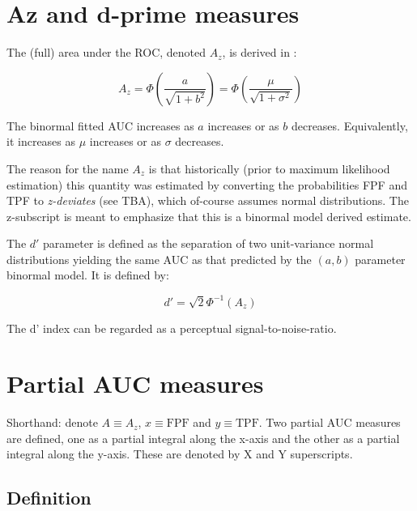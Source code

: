 \documentclass[
]{book}
\begin{document}
\hypertarget{binormal-model-full-auc}{%
\section{Az and d-prime measures}\label{binormal-model-full-auc}}

The (full) area under the ROC, denoted \(A_z\), is derived in \citep{thompson1989statistical}:

\begin{equation} 
A_z=\Phi\left ( \frac{a}{\sqrt{1+b^2}} \right )=\Phi\left ( \frac{\mu}{\sqrt{1+\sigma^2}} \right )
\label{eq:binormal-model-ab-2az}
\end{equation}

The binormal fitted AUC increases as \(a\) increases or as \(b\) decreases. Equivalently, it increases as \(\mu\) increases or as \(\sigma\) decreases.

The reason for the name \(A_z\) is that historically (prior to maximum likelihood estimation) this quantity was estimated by converting the probabilities FPF and TPF to \emph{z-deviates} (see TBA), which of-course assumes normal distributions. The z-subscript is meant to emphasize that this is a binormal model derived estimate.

The \(d'\) parameter is defined as the separation of two unit-variance normal distributions yielding the same AUC as that predicted by the \((a,b)\) parameter binormal model. It is defined by:

\begin{equation} 
d'=\sqrt{2}\Phi^{-1}\left ( A_z \right )
\label{eq:binormal-model-ab-2dprime}
\end{equation}

The d' index can be regarded as a perceptual signal-to-noise-ratio.

\hypertarget{binormal-model-partial-auc}{%
\section{Partial AUC measures}\label{binormal-model-partial-auc}}

Shorthand: denote \(A \equiv A_z\), \(x \equiv \text{FPF}\) and \(y \equiv \text{TPF}\). Two partial AUC measures are defined, one as a partial integral along the x-axis and the other as a partial integral along the y-axis. These are denoted by X and Y superscripts.

\hypertarget{binormal-model-meaning-partial-auc-definitions}{%
\subsection{Definition}\label{binormal-model-meaning-partial-auc-definitions}}
\end{document}
